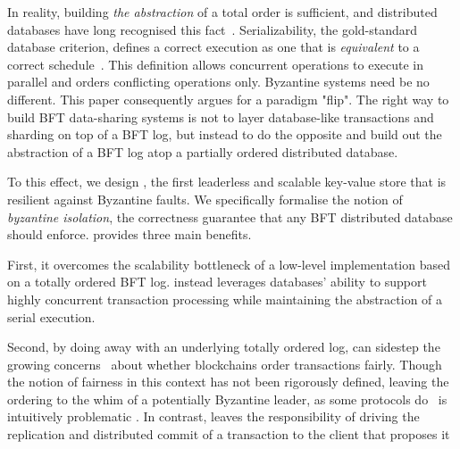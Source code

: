 In reality, building \textit{the abstraction} of a total order is sufficient, and distributed databases have long recognised this fact~\cite{crooks2018obladi,bernstein1979fas,Papadimitriou1979serializability,adya99weakconsis}.  Serializability, the gold-standard database criterion, defines a correct execution as one that is \textit{equivalent} to a correct schedule~\cite{bernstein1979fas,Papadimitriou1979serializability,bernstein1979fas}. This definition allows concurrent operations to execute in parallel and orders conflicting operations only.  Byzantine systems need be no different. This paper consequently argues for a paradigm "flip". The
right way to build BFT data-sharing systems is not to layer database-like transactions and sharding on top of a BFT log, but instead to do the opposite and build out the abstraction of a BFT log atop a partially ordered distributed database.

To this effect, we design \sys{}, the first leaderless and scalable key-value store that is resilient against
Byzantine faults. We specifically formalise the notion of \textit{byzantine isolation}, the correctness
guarantee that any BFT distributed database should enforce.  \sys{} provides three main benefits.

 First, it overcomes the scalability bottleneck of a low-level
implementation based on a totally ordered BFT log. \sys instead leverages databases' ability to support highly concurrent transaction
processing while maintaining the abstraction
of a serial execution.


Second, by doing away with an underlying totally ordered log, \sys{} can
sidestep the growing concerns~\cite{} about whether blockchains
order transactions fairly. Though the notion of fairness in this
context has not been rigorously defined, leaving the ordering to the
whim of a potentially Byzantine leader, as some protocols do~\cite{
Kotla07Zyzzyva,castro1999practical}
is intuitively problematic \cite{herlihy2016enhancing}. In contrast, \sys leaves the
responsibility of driving the replication and distributed commit of a
transaction to the client that proposes it   

